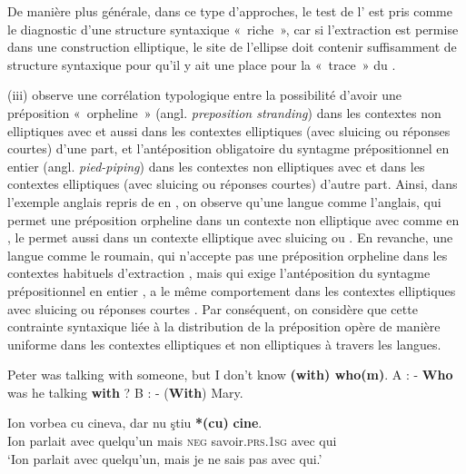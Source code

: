 \noindent De manière plus générale, dans ce type d’approches, le test de l’ est pris comme le diagnostic d’une structure syntaxique «~riche~», car si l’extraction est permise dans une construction elliptique, le site de l’ellipse doit contenir suffisamment de structure syntaxique pour qu’il y ait une place pour la «~trace~» du .~ 

(iii) \citet{Merchant2001,Merchant2004,Merchant2009} observe une corrélation typologique entre la possibilité d’avoir une préposition «~orpheline~» (angl. \textit{preposition stranding}) dans les contextes non elliptiques avec  et aussi dans les contextes elliptiques (avec sluicing ou réponses courtes) d’une part, et l’antéposition obligatoire du syntagme prépositionnel en entier (angl. \textit{pied-piping}) dans les contextes non elliptiques avec  et dans les contextes elliptiques (avec sluicing ou réponses courtes) d’autre part. Ainsi, dans l’exemple anglais repris de \citet{Merchant2009} en , on observe qu’une langue comme l’anglais, qui permet une préposition orpheline dans un contexte non elliptique avec  comme en , le permet aussi dans un contexte elliptique avec sluicing  ou  . En revanche, une langue comme le roumain, qui n’accepte pas une préposition orpheline dans les contextes habituels d’extraction , mais qui exige l’antéposition du syntagme prépositionnel en entier , a le même comportement dans les contextes elliptiques avec sluicing  ou réponses courtes . Par conséquent, on considère que cette contrainte syntaxique liée à la distribution de la préposition opère de manière uniforme dans les contextes elliptiques et non elliptiques à travers les langues.

\ea \label{ch1:ex109}
\ea  Peter was talking with someone, but I don’t know \textbf{(with) who(m)}. \label{ch1:ex109a} 
\ex  A : - \textbf{Who} was he talking \textbf{with} ? \label{ch1:ex109b}
\ex  B : - (\textbf{With})\textbf{} Mary. \label{ch1:ex109c}
\z
\z

\ea \label{ch1:ex110}
\ea
\gll Ion  vorbea  cu  cineva,  dar  nu  ştiu  \textbf{*(cu)} \textbf{cine}. \label{ch1:ex110a}\\
Ion  parlait  avec  quelqu’un  mais  \textsc{neg}  savoir.\textsc{prs.1sg}  avec  qui \\
\glt ‘Ion parlait avec quelqu’un, mais je ne sais pas avec qui.’ 

